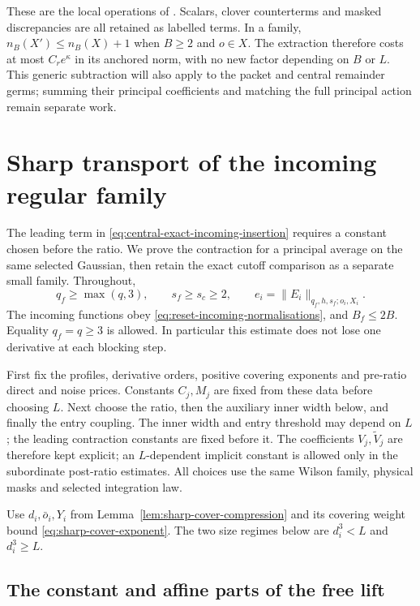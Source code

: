 \documentclass[11pt,reqno]{amsart}
\numberwithin{equation}{section}
\theoremstyle{definition}
\theoremstyle{remark}
\begin{document}
These are the local operations of
\cite[Lemmas~13.1--13.2 and 13.5--13.6, pp.~46--49]{Main}. Scalars,
clover counterterms and masked discrepancies are all retained
as labelled terms. In a family, \(n_B(X')\le n_B(X)+1\)
when \(B\ge2\) and \(o\in X\). The extraction therefore
costs at most \(C_re^\kappa\) in its anchored norm, with
no new factor depending on \(B\) or \(L\). This generic
subtraction will also apply to the packet and central
remainder germs; summing their principal coefficients and
matching the full principal action remain separate work.

\section{Sharp transport of the incoming regular family}
\label{sec:sharp-regular-transport}

The leading term in
\eqref{eq:central-exact-incoming-insertion} requires a constant
chosen before the ratio. We prove the contraction for a principal
average on the same selected Gaussian, then retain the exact
cutoff comparison as a separate small family. Throughout,
\begin{equation}
 q_f\ge\max(q,3),\qquad s_f\ge s_c\ge2,
 \qquad e_i=\|E_i\|_{q_f,h,s_f;o_i,X_i}.
 \label{eq:sharp-input-profile}
\end{equation}
The incoming functions obey
\eqref{eq:reset-incoming-normalisations}, and \(B_f\le2B\).
Equality \(q_f=q\ge3\) is allowed. In particular this estimate
does not lose one derivative at each blocking step.

First fix the profiles, derivative orders, positive covering
exponents and pre-ratio direct and noise prices. Constants
\(C_j,M_j\) are fixed from these data before choosing \(L\).
Next choose the ratio, then the auxiliary inner width below,
and finally the entry coupling. The inner width and entry
threshold may depend on \(L\); the leading contraction
constants are fixed before it. The coefficients
\(V_j,\widetilde V_j\) are therefore kept explicit; an
\(L\)-dependent implicit constant is allowed only in the
subordinate post-ratio estimates. All choices use the same
Wilson family, physical masks and selected integration law.

Use \(d_i,\bar o_i,Y_i\) from
Lemma~\ref{lem:sharp-cover-compression} and its
covering weight bound \eqref{eq:sharp-cover-exponent}.
The two size regimes below are \(d_i^3<L\) and
\(d_i^3\ge L\).

\subsection{The constant and affine parts of the free lift}
\end{document}

